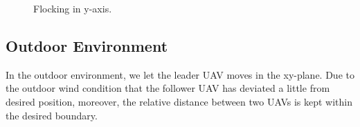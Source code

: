 \begin{figure}[htb]
  \caption{Flocking in y-axis.}\label{fig:y_indoor}
\end{figure}

\subsection{Outdoor Environment}

In the outdoor environment, we let the leader UAV moves in the xy-plane. Due to the outdoor wind condition that the follower UAV has deviated a little from desired position, moreover, the relative distance between two UAVs is kept within the desired boundary.

